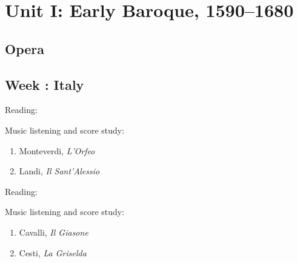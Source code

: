 \documentclass{article}
\newcounter{week}
\newcommand{\Week}[1]{%
	\stepcounter{week}%
	\subsection*{Week \theweek: #1}%
}
\newenvironment{Reading}
	{\noindent\ReadingHeader\par\begin{enumerate}}
	{\end{enumerate}}
\newenvironment{Listening}
	{\noindent\MusicHeader\par\begin{enumerate}}
	{\end{enumerate}}
\newcommand{\ReadingHeader}	{Reading:}
\newcommand{\MusicHeader}	{Music listening and score study:}
\newcommand{\Music}[1]{%
	\item{#1}%
}
\newcommand{\ti}[1]{%
	\emph{#1}%
}
\begin{document}
\section*{Unit I: Early Baroque, 1590--1680}
\subsection*{Opera}

\Week{Italy}

\begin{Reading}
\end{Reading}

\begin{Listening}
\Music{Monteverdi, \ti{L'Orfeo}}
\Music{Landi, \ti{Il Sant'Alessio}}
\end{Listening}


\begin{Reading}
\end{Reading}

\begin{Listening}
\Music{Cavalli, \ti{Il Giasone}}
\Music{Cesti, \ti{La Griselda}}
\end{Listening}
\end{document}
